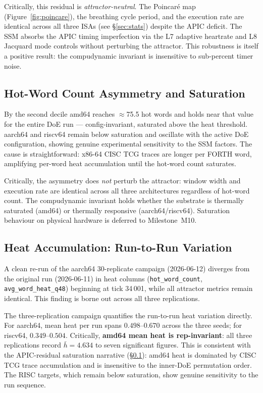 \documentclass[10pt,a4paper]{article}
\begin{document}
Critically, this residual is \emph{attractor-neutral}.  The Poincaré map
(Figure~\ref{fig:poincare}), the breathing cycle period, and the execution rate
are identical across all three ISAs (see §\ref{sec:stats}) despite the APIC
deficit.  The SSM absorbs the APIC timing imperfection via the L7 adaptive
heartrate and L8 Jacquard mode controls without perturbing the attractor.  This
robustness is itself a positive result: the compudynamic invariant is insensitive
to sub-percent timer noise.

\subsection{Hot-Word Count Asymmetry and Saturation}
\label{sec:disc_hot}

By the second decile amd64 reaches $\approx$75.5 hot words and holds near
that value for the entire DoE run --- config-invariant, saturated above the
heat threshold.  aarch64 and riscv64 remain below saturation and oscillate
with the active DoE configuration, showing genuine experimental sensitivity
to the SSM factors.  The cause is straightforward: x86-64 CISC TCG traces
are longer per FORTH word, amplifying per-word heat accumulation until the
hot-word count saturates.

Critically, the asymmetry does \emph{not} perturb the attractor: window
width and execution rate are identical across all three architectures
regardless of hot-word count.  The compudynamic invariant holds whether
the substrate is thermally saturated (amd64) or thermally responsive
(aarch64/riscv64).  Saturation behaviour on physical hardware is deferred
to Milestone~M10.

\subsection{Heat Accumulation: Run-to-Run Variation}
\label{sec:disc_heat_variation}

A clean re-run of the aarch64 30-replicate campaign (2026-06-12) diverges from
the original run (2026-06-11) in heat columns (\texttt{hot\_word\_count},
\texttt{avg\_word\_heat\_q48}) beginning at tick 34\,001, while all attractor
metrics remain identical.  This finding is borne out across all three
replications.

The three-replication campaign quantifies the run-to-run heat variation
directly.  For aarch64, mean heat per run spans $0.498$--$0.670$ across the
three seeds; for riscv64, $0.349$--$0.504$.  Critically, \textbf{amd64 mean
heat is rep-invariant}: all three replications record $\bar{h}=4.634$ to seven
significant figures.  This is consistent with the APIC-residual saturation
narrative (§\ref{sec:disc_hot}): amd64 heat is dominated by CISC TCG trace
accumulation and is insensitive to the inner-DoE permutation order.  The RISC
targets, which remain below saturation, show genuine sensitivity to the run
sequence.
\end{document}
